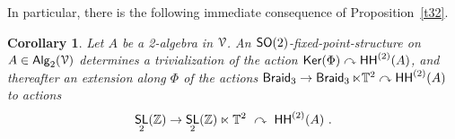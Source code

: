 \documentclass{amsart}
\newtheorem{cor}[theorem]{Corollary}
\theoremstyle{definition}
\theoremstyle{remark}
\DeclareMathOperator{\Alg}{\sf Alg}
\DeclareMathOperator{\Mod}{\sf Mod}
\DeclareMathOperator{\Aut}{\sf Aut}
\DeclareMathOperator{\Ker}{\sf Ker}
\newcommand{\lacts}{\curvearrowright}
\DeclareMathOperator{\Diff}{{\sf Diff}}
\DeclareMathOperator{\fr}{\sf fr}
\newcommand{\xra}{\xrightarrow}
\def\cE{\mathcal E}\def\cF{\mathcal F}\def\cG{\mathcal G}\def\cH{\mathcal H}
\DeclareMathOperator{\Braid}{{\sf Braid}_3}
\DeclareMathOperator{\SL}{\sf SL}
\DeclareMathOperator{\HHt}{{\sf HH}^{(2)}}
\begin{document}
%
%
%
%

















In particular, there is the following immediate consequence of Proposition~\ref{t32}.
\begin{cor}
\label{t37}
Let $A$ be a 2-algebra in $\mathcal V$.
An ${\sf SO}(2)$-fixed-point-structure on $A\in \Alg_2(\cV)$ 
determines a trivialization of the action $\Ker(\Phi) \lacts \HHt(A)$, and thereafter an extension along $\Phi$ of the actions $\Braid \to \Braid \ltimes \TT^2 \lacts \HHt(A)$ to 
actions
\[
\SL_2(\ZZ) \to \SL_2(\ZZ) \ltimes \TT^2 ~ \lacts~ \HHt(A)
~.  
\]

\end{cor}
\end{document}
